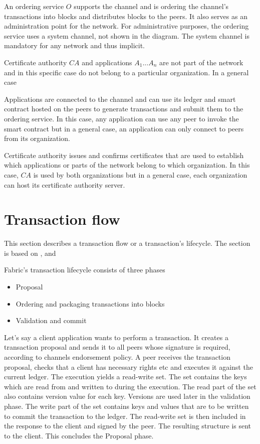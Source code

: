 An ordering service $O$ supports the channel and is ordering the channel's transactions into blocks and distributes blocks to the peers. It also serves as an administration point for the network. For administrative purposes, the ordering service uses a system channel, not shown in the diagram. The system channel is mandatory for any network and thus implicit.

Certificate authority $CA$ and applications $A_{1} ... A_{n}$ are not part of the network and in this specific case do not belong to a particular organization. In a general case

Applications are connected to the channel and can use its ledger and smart contract hosted on the peers to generate transactions and submit them to the ordering service. In this case, any application can use any peer to invoke the smart contract but in a general case, an application can only connect to peers from its organization.

Certificate authority issues and confirms certificates that are used to establish which applications or parts of the network belong to which organization. In this case, $CA$ is used by both organizations but in a general case, each organization can host its certificate authority server.

\newpage

\section{Transaction flow}
\label{sec:flow}
This section describes a transaction flow or a transaction's lifecycle. The section is based on \cite{fabricdocs:flow},  \cite{fabricdocs:peer} and \cite{fabricdocs:orderer}

Fabric's transaction lifecycle consists of three phases
\begin{itemize}
  \item Proposal
  \item Ordering and packaging transactions into blocks
  \item Validation and commit
\end{itemize}

Let's say a client application wants to perform a transaction. It creates a transaction proposal and sends it to all peers whose signature is required, according to channels endorsement policy.
A peer receives the transaction proposal, checks that a client has necessary rights etc and executes it against the current ledger. The execution yields a read-write set. The set contains the keys which are read from and written to during the execution. The read part of the set also contains version value for each key. Versions are used later in the validation phase. The write part of the set contains keys and values that are to be written to commit the transaction to the ledger. The read-write set is then included in the response to the client and signed by the peer. The resulting structure is sent to the client. This concludes the Proposal phase.

